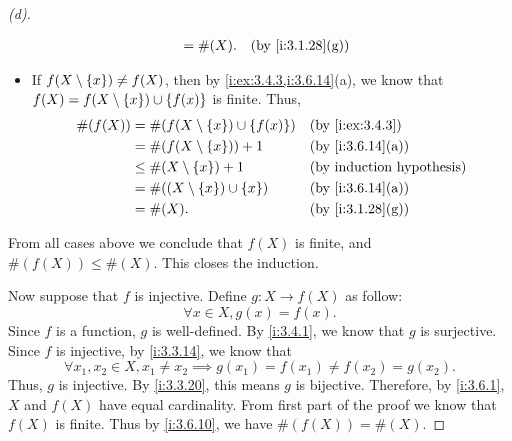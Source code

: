 \begin{proof}[(d)]
\begin{itemize}
\begin{align*}
                     & = \#(X).                                 &  & \by{i:3.1.28}[g]
          \end{align*}
    \item If \(f(X \setminus \left\lbrace x\right\rbrace) \neq f(X)\), then by \cref{i:ex:3.4.3,i:3.6.14}(a), we know that \(f(X) = f(X \setminus \left\lbrace x\right\rbrace) \cup \left\lbrace f(x)\right\rbrace\) is finite.
          Thus,
          \begin{align*}
            \#(f(X)) & = \#(f(X \setminus \set{x}) \cup \set{f(x)}) &  & \by{i:ex:3.4.3}  \\
                     & = \#(f(X \setminus \set{x})) + 1             &  & \by{i:3.6.14}[a] \\
                     & \leq \#(X \setminus \set{x}) + 1             &  & \byIH            \\
                     & = \#((X \setminus \set{x}) \cup \set{x})     &  & \by{i:3.6.14}[a] \\
                     & = \#(X).                                     &  & \by{i:3.1.28}[g]
          \end{align*}
  \end{itemize}
  From all cases above we conclude that \(f(X)\) is finite, and \(\#(f(X)) \leq \#(X)\).
  This closes the induction.

  Now suppose that \(f\) is injective.
  Define \(g : X \to f(X)\) as follow:
  \[
    \forall x \in X, g(x) = f(x).
  \]
  Since \(f\) is a function, \(g\) is well-defined.
  By \cref{i:3.4.1}, we know that \(g\) is surjective.
  Since \(f\) is injective, by \cref{i:3.3.14}, we know that
  \[
    \forall x_1, x_2 \in X, x_1 \neq x_2 \implies g(x_1) = f(x_1) \neq f(x_2) = g(x_2).
  \]
  Thus, \(g\) is injective.
  By \cref{i:3.3.20}, this means \(g\) is bijective.
  Therefore, by \cref{i:3.6.1}, \(X\) and \(f(X)\) have equal cardinality.
  From first part of the proof we know that \(f(X)\) is finite.
  Thus by \cref{i:3.6.10}, we have \(\#(f(X)) = \#(X)\).
\end{proof}

